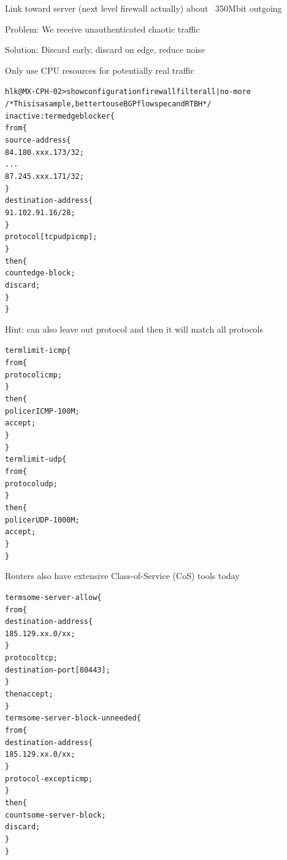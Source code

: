 \documentclass[20pt,landscape,a4paper,footrule]{foils}
\begin{document}
\centerline{Link toward server (next level firewall actually) about ~350Mbit outgoing}


\begin{list1}
\item Problem: We receive unauthenticated chaotic traffic

\item Solution: Discard early, discard on edge, reduce noise

\item Only use CPU resources for potentially real traffic
\end{list1}





\begin{alltt}\footnotesize
hlk@MX-CPH-02> show configuration firewall filter all | no-more
/* This is a sample, better to use BGP flowspec and RTBH */
inactive: term edgeblocker \{
    from \{
        source-address \{
            84.180.xxx.173/32;
...
            87.245.xxx.171/32;
        \}
        destination-address \{
            91.102.91.16/28;
        \}
        protocol [ tcp udp icmp ];
    \}
    then \{
        count edge-block;
        discard;
    \}
\}
\end{alltt}
Hint: can also leave out protocol and then it will match all protocols


\begin{alltt}\footnotesize
term limit-icmp \{
    from \{
        protocol icmp;
    \}
    then \{
        policer ICMP-100M;
        accept;
    \}
\}
term limit-udp \{
    from \{
        protocol udp;
    \}
    then \{
        policer UDP-1000M;
        accept;
    \}
\}
\end{alltt}

Routers also have extensive Class-of-Service (CoS) tools today


\begin{alltt}\footnotesize
term some-server-allow \{
    from \{
        destination-address \{
            185.129.xx.0/xx;
        \}
        protocol tcp;
        destination-port [ 80 443 ];
    \}
    then accept;
\}
term some-server-block-unneeded \{
    from \{
        destination-address \{
            185.129.xx.0/xx;
        \}
        protocol-except icmp;
    \}
    then \{
        count some-server-block;
        discard;
    \}
\}
\end{alltt}
\end{document}
